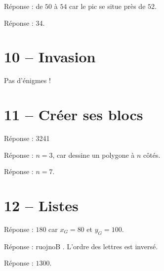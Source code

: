 \documentclass[class=report,crop=false, 12pt]{standalone}
\begin{document}
\begin{enigme}
Réponse : de $50$ à $54$ car le pic se situe près de $52$.
\end{enigme}

\begin{enigme}
Réponse : 34.
\end{enigme}


\section*{10 -- Invasion}

Pas d'énigmes !


\section*{11 -- Créer ses blocs}

\setcounter{enigme}{0}

\begin{enigme}
Réponse : 3241
\end{enigme}

\begin{enigme}
Réponse : $n=3$, car  dessine un polygone à $n$ côtés.
\end{enigme}

\begin{enigme}
Réponse : $n=7$.
\end{enigme}


\section*{12 -- Listes}

\setcounter{enigme}{0}

\begin{enigme}
Réponse : $180$ car $x_G = 80$ et $y_G = 100$. 
\end{enigme}

\begin{enigme}
Réponse : \og ruojnoB \fg{}. L'ordre des lettres est inversé. 
\end{enigme}

\begin{enigme}
Réponse : $1300$.
\end{enigme}
\end{document}
